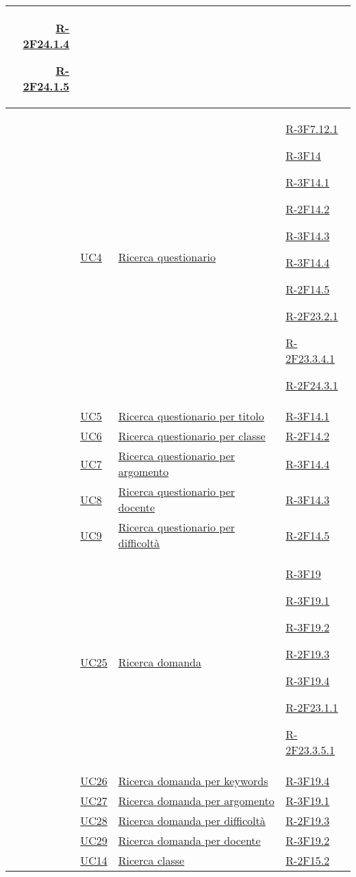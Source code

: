 \begin{longtable}{r l p{5cm} p{3cm}}
	\hyperlink{R-2F24.1.4}{R-2F24.1.4}
	
	\hyperlink{R-2F24.1.5}{R-2F24.1.5}\tabularnewline
	\hline
	& \hyperlink{UC4}{UC4} & \hyperlink{UC4}{Ricerca questionario} & \hyperlink{R-3F7.12.1}{R-3F7.12.1}
	
	\hyperlink{R-3F14}{R-3F14}
	
	\hyperlink{R-3F14.1}{R-3F14.1}
	
	\hyperlink{R-2F14.2}{R-2F14.2}
	
	\hyperlink{R-3F14.3}{R-3F14.3}
	
	\hyperlink{R-3F14.4}{R-3F14.4}
	
	\hyperlink{R-2F14.5}{R-2F14.5}
	
	\hyperlink{R-2F23.2.1}{R-2F23.2.1}
	
	\hyperlink{R-2F23.3.4.1}{R-2F23.3.4.1}
	
	\hyperlink{R-2F24.3.1}{R-2F24.3.1}\tabularnewline
	\hline
	& \hyperlink{UC5}{UC5} & \hyperlink{UC5}{Ricerca questionario per titolo} & \hyperlink{R-3F14.1}{R-3F14.1}\tabularnewline
	\hline
	& \hyperlink{UC6}{UC6} & \hyperlink{UC6}{Ricerca questionario per classe} & \hyperlink{R-2F14.2}{R-2F14.2}\tabularnewline
	\hline
	& \hyperlink{UC7}{UC7} & \hyperlink{UC7}{Ricerca questionario per argomento} & \hyperlink{R-3F14.4}{R-3F14.4}\tabularnewline
	\hline
	& \hyperlink{UC8}{UC8} & \hyperlink{UC8}{Ricerca questionario per docente} & \hyperlink{R-3F14.3}{R-3F14.3}\tabularnewline
	\hline
	& \hyperlink{UC9}{UC9} & \hyperlink{UC9}{Ricerca questionario per difficoltà} & \hyperlink{R-2F14.5}{R-2F14.5}\tabularnewline
	\hline
	& \hyperlink{UC25}{UC25} & \hyperlink{UC25}{Ricerca domanda} & \hyperlink{R-3F19}{R-3F19}
	
	\hyperlink{R-3F19.1}{R-3F19.1}
	
	\hyperlink{R-3F19.2}{R-3F19.2}
	
	\hyperlink{R-2F19.3}{R-2F19.3}
	
	\hyperlink{R-3F19.4}{R-3F19.4}
	
	\hyperlink{R-2F23.1.1}{R-2F23.1.1}
	
	\hyperlink{R-2F23.3.5.1}{R-2F23.3.5.1}\tabularnewline
	\hline
	& \hyperlink{UC26}{UC26} & \hyperlink{UC26}{Ricerca domanda per keywords} & \hyperlink{R-3F19.4}{R-3F19.4}\tabularnewline
	\hline
	& \hyperlink{UC27}{UC27} & \hyperlink{UC27}{Ricerca domanda per argomento} & \hyperlink{R-3F19.1}{R-3F19.1}\tabularnewline
	\hline
	& \hyperlink{UC28}{UC28} & \hyperlink{UC28}{Ricerca domanda per difficoltà} & \hyperlink{R-2F19.3}{R-2F19.3}\tabularnewline
	\hline
	& \hyperlink{UC29}{UC29} & \hyperlink{UC29}{Ricerca domanda per docente} & \hyperlink{R-3F19.2}{R-3F19.2}\tabularnewline
	\hline
	& \hyperlink{UC14}{UC14} & \hyperlink{UC14}{Ricerca classe} & \hyperlink{R-2F15.2}{R-2F15.2}
	

\end{longtable}
